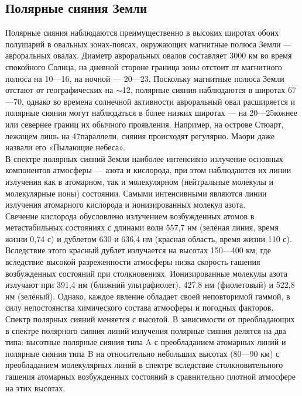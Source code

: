\documentclass[a4paper,14pt]{article}
\begin{document}
\subsection{Полярные сияния Земли}
Полярные сияния наблюдаются преимущественно в высоких широтах обоих полушарий в овальных зонах-поясах, 
окружающих магнитные полюса Земли — авроральных овалах. Диаметр авроральных овалов составляет 3000 км во время 
спокойного Солнца, на дневной стороне граница зоны отстоит от магнитного полюса на 10—16\textdegree, 
на ночной — 20—23\textdegree. Поскольку магнитные полюса Земли отстают от географических на $\sim$12\textdegree,
полярные сияния наблюдаются в широтах 67—70\textdegree, однако во времена солнечной активности авроральный овал 
расширяется и полярные сияния могут наблюдаться в более низких широтах — на 20—25\textdegree южнее или севернее границ 
их обычного проявления. Например, на острове Стюарт, лежащем лишь на 47\textdegree параллели, сияния происходят регулярно. 
Маори даже назвали его «Пылающие небеса». \\
\indent В спектре полярных сияний Земли наиболее интенсивно излучение основных компонентов атмосферы — азота и кислорода, при этом 
наблюдаются их линии излучения как в атомарном, так и молекулярном (нейтральные молекулы и молекулярные ионы) состоянии. Самыми 
интенсивными являются линии излучения атомарного кислорода и ионизированных молекул азота. \\
\indent Свечение кислорода обусловлено излучением возбужденных атомов в метастабильных состояниях с длинами волн 557,7 нм (зелёная линия,
время жизни 0,74 с) и дублетом 630 и 636,4 нм (красная область, время жизни 110 с). Вследствие этого красный дублет излучается 
на высотах 150—400 км, где вследствие высокой разреженности атмосферы низка скорость гашения возбужденных состояний при столкновениях. 
Ионизированные молекулы азота излучают при 391,4 нм (ближний ультрафиолет), 427,8 нм (фиолетовый) и 522,8 нм (зелёный). Однако, каждое
явление обладает своей неповторимой гаммой, в силу непостоянства химического состава атмосферы и погодных факторов.\\
\indent Спектр полярных сияний меняется с высотой. В зависимости от преобладающих в спектре полярного сияния линий излучения полярные 
сияния делятся на два типа: высотные полярные сияния типа A с преобладанием атомарных линий и полярные сияния типа B на относительно 
небольших высотах (80—90 км) с преобладанием молекулярных линий в спектре вследствие столкновительного гашения атомарных возбужденных 
состояний в сравнительно плотной атмосфере на этих высотах. \\
\end{document}
